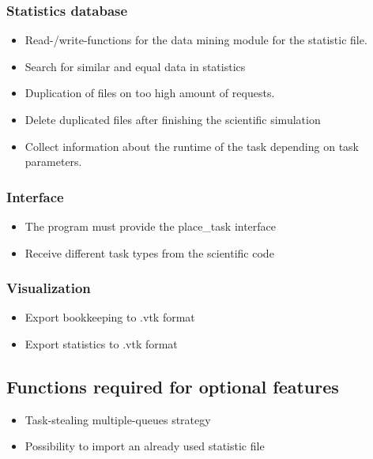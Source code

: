 {		\subsubsection{Statistics database}
	
			\begin{itemize}
				\item Read-/write-functions for the data mining module for the statistic file.
				\item Search for similar and equal data in statistics
				\item Duplication of files on too high amount of requests.
				\item Delete duplicated files after finishing the scientific simulation
				\item Collect information about the runtime of the task depending on task parameters.
			\end{itemize}
	
	
	\subsubsection{Interface}
		\begin{itemize}
		
			\item The program must provide the place\_task interface
			\item Receive different task types from the scientific code
		\end{itemize}
		
		
	\subsubsection{Visualization}
	
		\begin{itemize}
			\item Export bookkeeping to .vtk format
			\item Export statistics to .vtk format
		\end{itemize}
		
	\subsection{Functions required for optional features}
	
		\begin{itemize}
			\item Task-stealing multiple-queues strategy%
			\item Possibility to import an already used statistic file%
		\end{itemize}
		
}
